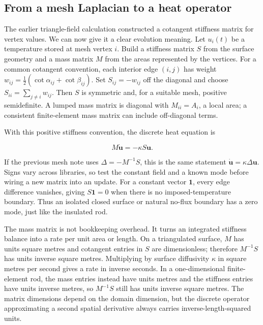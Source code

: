 \subsection{From a mesh Laplacian to a heat operator}\label{02-foundations-ii-ch025-from-a-mesh-laplacian-to-a-heat-operator}

The earlier triangle-field calculation constructed a cotangent stiffness matrix for vertex values. We can now give it a clear evolution meaning. Let \(u_i(t)\) be a temperature stored at mesh vertex \(i\). Build a stiffness matrix \(S\) from the surface geometry and a mass matrix \(M\) from the areas represented by the vertices. For a common cotangent convention, each interior edge \((i,j)\) has weight \(w_{ij}=\tfrac12(\cot\alpha_{ij}+\cot\beta_{ij})\). Set \(S_{ij}=-w_{ij}\) off the diagonal and choose \(S_{ii}=\sum_{j\ne i}w_{ij}\). Then \(S\) is symmetric and, for a suitable mesh, positive semidefinite. A lumped mass matrix is diagonal with \(M_{ii}=A_i\), a local area; a consistent finite-element mass matrix can include off-diagonal terms.

With this positive stiffness convention, the discrete heat equation is

\[
M\dot{\mathbf u}=-\kappa S\mathbf u.
\]

If the previous mesh note uses \(\Delta=-M^{-1}S\), this is the same statement \(\dot{\mathbf u}=\kappa\Delta\mathbf u\). Signs vary across libraries, so test the constant field and a known mode before wiring a new matrix into an update. For a constant vector \(\mathbf 1\), every edge difference vanishes, giving \(S\mathbf 1=0\) when there is no imposed-temperature boundary. Thus an isolated closed surface or natural no-flux boundary has a zero mode, just like the insulated rod.

The mass matrix is not bookkeeping overhead. It turns an integrated stiffness balance into a rate per unit area or length. On a triangulated surface, \(M\) has units square metres and cotangent entries in \(S\) are dimensionless; therefore \(M^{-1}S\) has units inverse square metres. Multiplying by surface diffusivity \(\kappa\) in square metres per second gives a rate in inverse seconds. In a one-dimensional finite-element rod, the mass entries instead have units metres and the stiffness entries have units inverse metres, so \(M^{-1}S\) still has units inverse square metres. The matrix dimensions depend on the domain dimension, but the discrete operator approximating a second spatial derivative always carries inverse-length-squared units.

